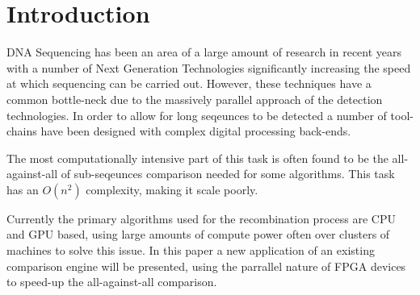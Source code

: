 \documentclass[conference]{IEEEtran}
\begin{document}

%
\IEEEpeerreviewmaketitle



\section{Introduction}
DNA Sequencing has been an area of a large amount of research in recent years with a number of Next Generation Technologies significantly increasing the speed at which sequencing can be carried out. However, these techniques have a common bottle-neck due to the massively parallel approach of the detection technologies.  In order to allow for long seqeunces to be detected a number of tool-chains have been designed with complex digital processing back-ends. 

The most computationally intensive part of this task is often found to be the all-against-all of sub-seqeunces comparison needed for some algorithms. This task has an $O(n^2)$ complexity, making it scale poorly. 

Currently the primary algorithms used for the recombination process are CPU and GPU based, using large amounts of compute power often over clusters of machines to solve this issue. In this paper a new application of an existing comparison engine will be presented, using the parrallel nature of FPGA devices to speed-up the all-against-all comparison.
\end{document}
